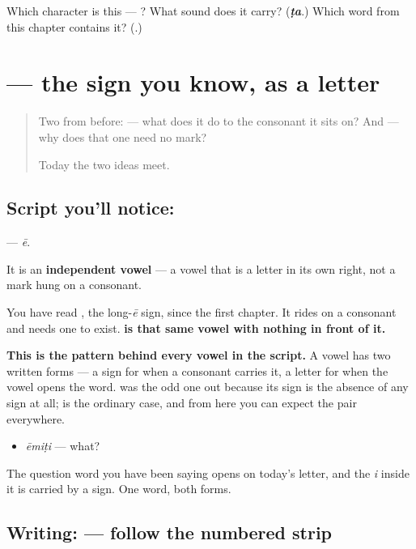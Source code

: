 \begin{tcolorbox}[breakable,colback=teal!4,colframe=teal!35!black,title={Before you move on}]
Which character is this — ? What sound does it carry? (\emph{\textbf{ṭa}}.) Which word from this chapter contains it? (\textbf{}.)
\end{tcolorbox}
\section[\texorpdfstring{\te{ఏ} (ē)}{ఏ (ē)}]{ — the sign you know, as a letter}

\label{lesson:TE-S163-letter-ee}



\begin{quote}
Two from before:  — what does it do to the consonant it sits on? And  — why does that one need no mark?

Today the two ideas meet.
\end{quote}

\subsection*{Script you'll notice: }
\textbf{} — \emph{ē}.

It is an \textbf{independent vowel} — a vowel that is a letter in its own right, not a mark hung on a consonant.

You have read \textbf{}, the long-\emph{ē} sign, since the first chapter. It rides on a consonant and needs one to exist. \textbf{ is that same vowel with nothing in front of it.}

\textbf{This is the pattern behind every vowel in the script.} A vowel has two written forms — a sign for when a consonant carries it, a letter for when the vowel opens the word.  was the odd one out because its sign is the absence of any sign at all;  is the ordinary case, and from here you can expect the pair everywhere.

\begin{itemize}
\raggedright
  \item \textbf{} \emph{ēmiṭi} — what?
\end{itemize}

The question word you have been saying opens on today's letter, and the \emph{i} inside it is carried by a sign. One word, both forms.

\subsection*{Writing:  — follow the numbered strip}

